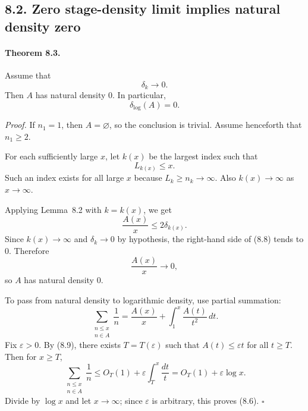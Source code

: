 \subsection*{8.2. Zero stage-density limit implies natural density zero}
\paragraph{Theorem 8.3.}
Assume that
\begin{equation}
\delta_k\longrightarrow 0.
\tag{8.5}
\end{equation}
Then $A$ has natural density $0$.
In particular,
\begin{equation}
\delta_{\log}(A)=0.
\tag{8.6}
\end{equation}

\emph{Proof.}
If $n_1=1$, then $A=\varnothing$, so the conclusion is trivial.  Assume henceforth that $n_1\ge 2$.

For each sufficiently large $x$, let $k(x)$ be the largest index such that
\begin{equation}
L_{k(x)}\le x.
\tag{8.7}
\end{equation}
Such an index exists for all large $x$ because $L_k\ge n_k\to\infty$.
Also $k(x)\to\infty$ as $x\to\infty$.

Applying Lemma~8.2 with $k=k(x)$, we get
\begin{equation}
\frac{A(x)}{x}\le 2\delta_{k(x)}.
\tag{8.8}
\end{equation}
Since $k(x)\to\infty$ and $\delta_k\to 0$ by hypothesis, the right-hand side of (8.8) tends to $0$.
Therefore
\begin{equation}
\frac{A(x)}{x}\longrightarrow 0,
\tag{8.9}
\end{equation}
so $A$ has natural density $0$.

To pass from natural density to logarithmic density, use partial summation:
\begin{equation}
\sum_{\substack{n\le x\\ n\in A}}\frac1n
=
\frac{A(x)}{x}
+
\int_1^x \frac{A(t)}{t^2}\,dt.
\tag{8.10}
\end{equation}
Fix $\varepsilon>0$.  By (8.9), there exists $T=T(\varepsilon)$ such that $A(t)\le \varepsilon t$ for all $t\ge T$.
Then for $x\ge T$,
\[
\sum_{\substack{n\le x\\ n\in A}}\frac1n
\le O_T(1)+\varepsilon\int_T^x \frac{dt}{t}
=O_T(1)+\varepsilon\log x.
\]
Divide by $\log x$ and let $x\to\infty$; since $\varepsilon$ is arbitrary, this proves (8.6). \hfill $\square$

